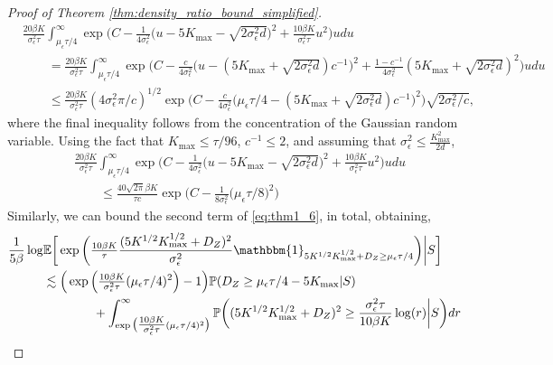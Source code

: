\documentclass[10pt]{article}
\theoremstyle{plain}
\theoremstyle{definition}
\theoremstyle{remark}
\newcommand{\E}{\mathbb{E}}
\newcommand{\prob}{\mathbb{P}}
\begin{document}
\begin{proof}[Proof of Theorem \ref{thm:density_ratio_bound_simplified}]
\begin{align*}
    &\frac{20\beta K} {\sigma^2_\epsilon \tau}\int_{\mu_\epsilon \tau/4}^\infty \exp \bigg ( C - \frac{1}{4 \sigma_\epsilon^2} \big ( u - 5 K_{\max} - \sqrt{2 \sigma_\epsilon^2 d} \big )^2 + \frac{10\beta K}{\sigma^2_\epsilon \tau} u^2 \bigg )u du\\
    &\qquad = \frac{20\beta K}{\sigma^2_\epsilon \tau}\int_{\mu_\epsilon \tau/4}^\infty \exp \bigg ( C - \frac{c}{4\sigma_\epsilon^2} \bigg ( u - (5 K_{\max} + \sqrt{2 \sigma_\epsilon^2 d}) c^{-1} \bigg )^2 + \frac{1-c^{-1}}{4\sigma_\epsilon^2} (5 K_{\max} + \sqrt{2 \sigma_\epsilon^2 d})^2 \bigg )u du\\
    &\qquad \leq \frac{20\beta K}{\sigma^2_\epsilon \tau} (4 \sigma_\epsilon^2 \pi/c)^{1/2} \exp \bigg ( C - \frac{c}{4\sigma_\epsilon^2} \bigg ( \mu_\epsilon \tau/4 - (5 K_{\max} + \sqrt{2 \sigma_\epsilon^2 d})c^{-1} \bigg )^2 \bigg ) \sqrt{2 \sigma_\epsilon^2/c},
\end{align*}
where the final inequality follows from the concentration of the Gaussian random variable. Using the fact that \(K_{\max} \leq \tau/96\), \(c^{-1} \leq 2\), and assuming that \(\sigma_\epsilon^2 \leq \frac{K_{\max}^2}{2d}\),
\begin{align*}
    &\frac{20\beta K} {\sigma^2_\epsilon \tau}\int_{\mu_\epsilon \tau/4}^\infty \exp \bigg ( C - \frac{1}{4 \sigma_\epsilon^2} \big ( u - 5 K_{\max} - \sqrt{2 \sigma_\epsilon^2 d} \big )^2 + \frac{10\beta K}{\sigma^2_\epsilon \tau} u^2 \bigg )u du \\
    & \qquad \leq \frac{40\sqrt{2 \pi}\beta K}{\tau c} \exp \bigg ( C - \frac{1}{8\sigma_\epsilon^2} \big ( \mu_\epsilon \tau/8 \big )^2 \bigg )
\end{align*}
Similarly, we can bound the second term of \eqref{eq:thm1_6}, in total, obtaining,
\begin{align*}
    \frac{1}{5\beta} \log & \E \bigg [ \exp \bigg ( \tfrac{10\beta K}{\tau} \frac{(5 K^{1/2} K_{\max}^{1/2} + D_Z)^2}{\sigma^2_\epsilon} \mathbbm{1}_{5 K^{1/2} K_{\max}^{1/2}+D_Z \geq \mu_\epsilon \tau/4} \bigg ) \bigg | S \bigg ]\\
    &\lesssim \Big ( \exp \Big ( \tfrac{10\beta K}{\sigma^2_\epsilon \tau}(\mu_\epsilon \tau/4)^2 \Big ) - 1 \Big ) \prob ( D_Z \geq \mu_\epsilon \tau/4 - 5 K_{\max} | S ) \\
    &\qquad \qquad + \int_{\exp \big ( \tfrac{10\beta K}{\sigma^2_\epsilon \tau}(\mu_\epsilon \tau/4)^2 \big )}^\infty \prob \bigg ( (5 K^{1/2} K_{\max}^{1/2} + D_Z)^2 \geq \frac{\sigma^2_\epsilon \tau}{10\beta K} \log(r) \bigg | S \bigg ) dr\\

\end{align*}
\end{proof}
\end{document}
